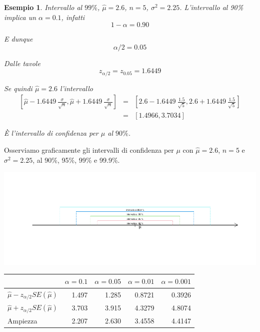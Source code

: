 \documentclass[
  11pt,
]{book}
\theoremstyle{mytheoremstyle}
\theoremstyle{mydefstyle}
\newtheorem{example}{{Esempio}}[section]
\begin{document}
\begin{example}
Intervallo al \(99\%\), \(\hat \mu=2.6\), \(n=5\), \(\sigma^2=2.25\). L'intervallo al 90\% implica un \(\alpha=0.1\), infatti
\[1-\alpha=0.90\]

E dunque
\[\alpha/2=0.05\]

Dalle tavole
\[z_{\alpha/2}=z_{0.05}=1.6449\]

Se quindi \(\hat \mu = 2.6\) l'intervallo
\begin{eqnarray*}
 \left[\hat \mu- 1.6449~\frac\sigma{\sqrt n},\hat \mu+ 1.6449~\frac\sigma{\sqrt n}\right] &=&
\left[2.6- 1.6449~\frac{1.5}{\sqrt 5},2.6+ 1.6449~\frac{1.5}{\sqrt 5}\right]\\
 &=& \left[1.4966,3.7034\right]
\end{eqnarray*}

È l'intervallo di confidenza per \(\mu\) al \(90\%\).
\end{example}

Osserviamo graficamente gli intervalli di confidenza per \(\mu\) con \(\hat \mu=2.6\), \(n=5\) e \(\sigma^2=2.25\), al 90\%, 95\%, 99\% e 99.9\%.

\begin{center}\includegraphics{Appunti_di_Statistica_2025_files/figure-latex/13-stima-intervallare-1-1} \end{center}

\begin{tabular}{lrrrr}
\toprule
  & $\alpha=0.1$ & $\alpha=0.05$ & $\alpha=0.01$ & $\alpha=0.001$\\
\midrule
$\hat \mu - z_{\alpha/2}SE(\hat \mu)$ & 1.497 & 1.285 & 0.8721 & 0.3926\\
$\hat \mu + z_{\alpha/2}SE(\hat \mu)$ & 3.703 & 3.915 & 4.3279 & 4.8074\\
Ampiezza & 2.207 & 2.630 & 3.4558 & 4.4147\\
\bottomrule
\end{tabular}
\end{document}
